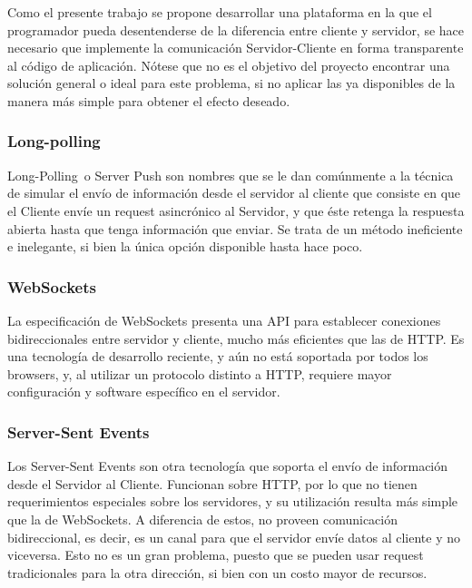 \documentclass[doc,helv,longtable]{article}
\begin{document}
Como el presente trabajo se propone desarrollar una plataforma en la que el programador pueda desentenderse de la diferencia entre cliente y servidor, se hace necesario que implemente la comunicación Servidor-Cliente en forma transparente al código de aplicación. Nótese que no es el objetivo del proyecto encontrar una solución general o ideal para este problema, si no aplicar las ya disponibles de la manera más simple para obtener el efecto deseado.

\subsubsection{Long-polling}
Long-Polling o Server Push\cite{longpolling} son nombres que se le dan comúnmente a la técnica de simular el envío de información desde el servidor al cliente que consiste en que el Cliente envíe un request asincrónico al Servidor, y que éste retenga la respuesta abierta hasta que tenga información que enviar. Se trata de un método ineficiente e inelegante, si bien la única opción disponible hasta hace poco.

\subsubsection{WebSockets}
La especificación de WebSockets presenta una API para establecer conexiones bidireccionales entre servidor y cliente, mucho más eficientes que las de HTTP\cite{websockets}. Es una tecnología de desarrollo reciente, y aún no está soportada por todos los browsers, y, al utilizar un protocolo distinto a HTTP, requiere mayor configuración y software específico en el servidor.

\subsubsection{Server-Sent Events}
Los Server-Sent Events\cite{sse} son otra tecnología que soporta el envío de información desde el Servidor al Cliente. Funcionan sobre HTTP, por lo que no tienen requerimientos especiales sobre los servidores, y su utilización resulta más simple que la de WebSockets\cite{congress}\cite{wsvssse2}. A diferencia de estos, no proveen comunicación bidireccional, es decir, es un canal para que el servidor envíe datos al cliente y no viceversa. Esto no es un gran problema, puesto que se pueden usar request tradicionales para la otra dirección, si bien con un costo mayor de recursos\cite{ssedownside}.
\end{document}
